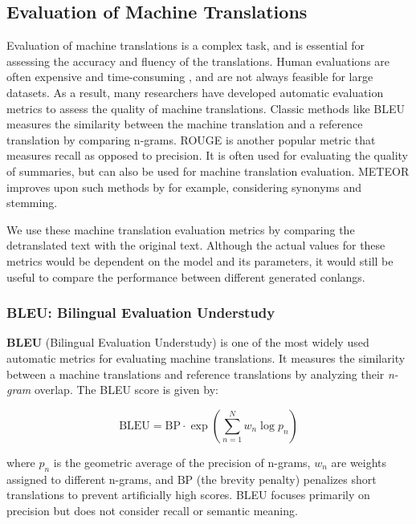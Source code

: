 \subsection{Evaluation of Machine Translations}
Evaluation of machine translations is a complex task, and is essential for assessing the accuracy and fluency of the translations. Human evaluations
are often expensive and time-consuming \cite{papineniBLEUMethodAutomatic2002}, and are not always feasible for large datasets. As a result, many researchers 
have developed automatic evaluation metrics to assess the quality of machine translations. Classic methods like BLEU \cite{papineniBLEUMethodAutomatic2002} measures
the similarity between the machine translation and a reference translation by comparing n-grams. ROUGE \cite{linROUGEPackageAutomatic2004} is another popular metric that
measures recall as opposed to precision. It is often used for evaluating the quality of summaries, but can also be used for machine translation evaluation. METEOR \cite{banerjeeMETEORAutomaticMetric2005} 
improves upon such methods by for example, considering synonyms and stemming. 

We use these machine translation evaluation metrics by comparing the detranslated text with the original text. Although the actual values for these metrics would be
dependent on the model and its parameters, it would still be useful to compare the performance between different generated conlangs. 

\subsubsection{BLEU: Bilingual Evaluation Understudy} 
\textbf{BLEU} (Bilingual Evaluation Understudy) \cite{papineniBLEUMethodAutomatic2002} is one of the most widely used automatic metrics for 
evaluating machine translations. It measures the similarity between a machine translations and reference translations by analyzing their \textit{n-gram} overlap. The BLEU score is given by:

\begin{equation}
\text{BLEU} = \text{BP} \cdot \exp\left(\sum_{n=1}^{N} w_n \log p_n \right)
\end{equation}

where  $p_n$ is the geometric average of the precision of n-grams,  $w_n$ are weights assigned to different n-grams, and  $\text{BP}$ (the brevity penalty) 
penalizes short translations to prevent artificially high scores. BLEU focuses primarily on precision but does not consider recall or semantic meaning.

